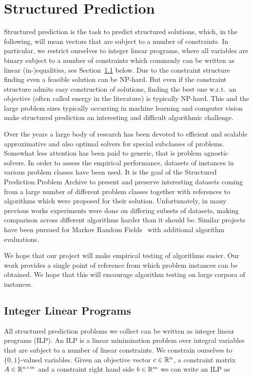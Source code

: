 \section{Structured Prediction}
Structured prediction is the task to predict structured solutions, which, in the following, will mean vectors that are subject to a number of constraints.
In particular, we restrict ourselves to integer linear programs, where all variables are binary subject to a number of constraints which commonly can be written as linear (in-)equalities, see Section~\ref{sec:ilp} below.
Due to the constraint structure finding even a feasible solution can be NP-hard. 
But even if the constraint structure admits easy construction of solutions, finding the best one w.r.t.\ an objective (often called energy in the literature) is typically NP-hard.
This and the large problem sizes typically occurring in machine learning and computer vision make structured prediction an interesting and difficult algorithmic challenge.

Over the years a large body of research has been devoted to efficient and scalable approximative and also optimal solvers for special subclasses of problems.
Somewhat less attention has been paid to generic, that is problem agnostic solvers.
In order to assess the empirical performance, datasets of instances in various problem classes have been  used.
It is the goal of the Structured Prediction Problem Archive to present and preserve interesting datasets coming from a large number of different problem classes together with references to algorithms which were proposed for their solution.
Unfortunately, in many previous works experiments were done on differing subsets of datasets, making comparison across different algorithms harder than it should be.
Similar projects have been pursued for Markov Random Fields~\cite{kappes2015comparative,szeliski2008comparative} with additional algorithm evaluations.

We hope that our project will make empirical testing of algorithms easier.
Our work provides a single point of reference from which problem instances can be obtained.
We hope that this will encourage algorithm testing on large corpora of instances.

\subsection{Integer Linear Programs}
\label{sec:ilp}
All structured prediction problems we collect can be written as integer linear programs (ILP).
An ILP is a linear minimization problem over integral variables that are subject to a number of linear constraints.
We constrain ourselves to $\{0,1\}$-valued variables.
Given an objective vector $c \in \mathbb{R}^n$, a constraint matrix $A \in \mathbb{R}^{n \times m}$ and a constraint right hand side $b \in \mathbb{R}^m$ we can write an ILP as

